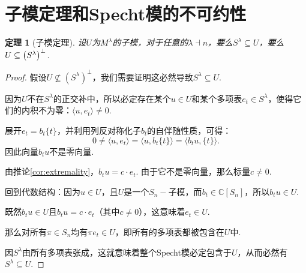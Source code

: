 \documentclass{sjtureport}
\newtheorem{theorem}{定理}[chapter]
\begin{document}
\section{子模定理和Specht模的不可约性}

\begin{theorem}[子模定理]
    设$U$为$M^\lambda$的子模，对于任意的$\lambda \dashv n$，要么$S^\lambda \subseteq U$，要么$U\subseteq \qty(S^\lambda)^{\perp}$.
\end{theorem}
\begin{proof}
    假设$U \not\subseteq (S^\lambda)^\perp$，我们需要证明这必然导致$S^\lambda \subseteq U$.
    
    因为$U$不在$S^\lambda$的正交补中，所以必定存在某个$u \in U$和某个多项表$e_t \in S^\lambda$，使得它们的内积不为零：$\langle u, e_t \rangle \neq 0$. 
    
    展开$e_t = b_t\{t\}$，并利用列反对称化子$b_t$的自伴随性质，可得：
    \begin{equation*}
        0 \neq \langle u, e_t \rangle = \langle u, b_t\{t\} \rangle = \langle b_t u, \{t\} \rangle.
    \end{equation*}
    因此向量$b_tu$不是零向量.
    
    由推论{\ref{cor:extremality}}，$b_tu = c \cdot e_t$. 由于它不是零向量，那么标量$c \neq 0$.
    
    回到代数结构：因为$u \in U$，且$U$是一个$S_n-\!$子模，而$b_t \in \mathbb{C}[S_n]$，所以$b_tu \in U$.
    
    既然$b_tu \in U$且$b_tu = c \cdot e_t$（其中$c \neq 0$），这意味着$e_t \in U$.
    
    那么对所有$\pi \in S_n$均有$\pi e_t \in U$，即所有的多项表都被包含在$U$中. \par
    因$S^\lambda$由所有多项表张成，这就意味着整个Specht模必定包含于$U$，从而必然有$S^\lambda \subseteq U$.
\end{proof}
\end{document}
